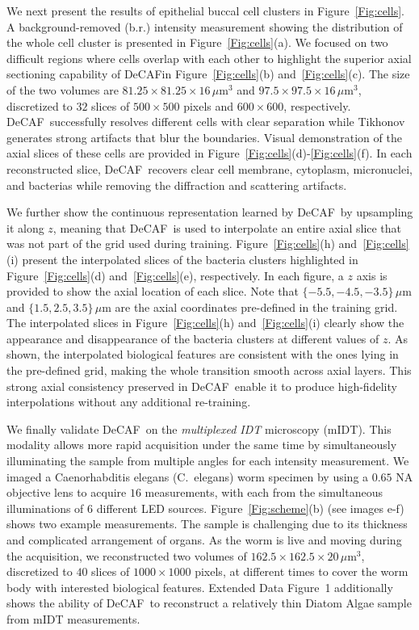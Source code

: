 \documentclass[11pt]{article}
\theoremstyle{plain} %
\def\proposed{DeCAF}
\begin{document}
We next present the results of epithelial buccal cell clusters in Figure~\ref{Fig:cells}. 
A background-removed (b.r.) intensity measurement showing the distribution of the whole cell cluster is presented in Figure~\ref{Fig:cells}(a).
We focused on two difficult regions where cells overlap with each other to highlight the superior axial sectioning capability of \proposed in Figure~\ref{Fig:cells}(b) and~\ref{Fig:cells}(c).
The size of the two volumes are $81.25\times81.25\times16\,\mu$m$^3$ and $97.5\times97.5\times16\,\mu$m$^3$, discretized to $32$ slices of $500 \times 500$ pixels and $600\times600$, respectively.
\proposed~successfully resolves different cells with clear separation while Tikhonov generates strong artifacts that blur the boundaries. Visual demonstration of the axial slices of these cells are provided in Figure~\ref{Fig:cells}(d)-\ref{Fig:cells}(f).
In each reconstructed slice, \proposed~recovers clear cell membrane, cytoplasm, micronuclei, and bacterias while removing the diffraction and scattering artifacts.

We further show the continuous representation learned by \proposed~by upsampling it along $z$, meaning that \proposed~is used to interpolate an entire axial slice that was not part of the grid used during training. Figure~\ref{Fig:cells}(h) and~\ref{Fig:cells}(i) present the interpolated slices of the bacteria clusters highlighted in Figure~\ref{Fig:cells}(d) and~\ref{Fig:cells}(e), respectively.
In each figure, a $z$ axis is provided to show the axial location of each slice. 
Note that $\{-5.5, -4.5, -3.5\}\,\mu$m and $\{1.5, 2.5, 3.5\}\,\mu$m are the axial coordinates pre-defined in the training grid.
The interpolated slices in Figure~\ref{Fig:cells}(h) and~\ref{Fig:cells}(i) clearly show the appearance and disappearance of the bacteria clusters at different values of $z$. 
As shown, the interpolated biological features are consistent with the ones lying in the pre-defined grid, making the whole transition smooth across axial layers.
This strong axial consistency preserved in \proposed~enable it to produce high-fidelity interpolations without any additional re-training. 

We finally validate \proposed~on the \emph{multiplexed IDT} microscopy (mIDT). This modality allows more rapid acquisition under the same time by simultaneously illuminating the sample from multiple angles for each intensity measurement. 
We imaged a Caenorhabditis elegans (C.\ elegans) worm specimen by using a $0.65$ NA objective lens to acquire $16$ measurements, with each from the simultaneous illuminations of $6$ different LED sources.
Figure~\ref{Fig:scheme}(b) (see images e-f) shows two example measurements.
The sample is challenging due to its thickness and complicated arrangement of organs. 
As the worm is live and moving during the acquisition, we reconstructed two volumes of $162.5\times162.5\times20\,\mu$m$^3$, discretized to $40$ slices of $1000\times1000$ pixels, at different times to cover the worm body with interested biological features.
Extended Data Figure~1 additionally shows the ability of \proposed~to reconstruct a relatively thin Diatom Algae sample from mIDT measurements.
\end{document}
